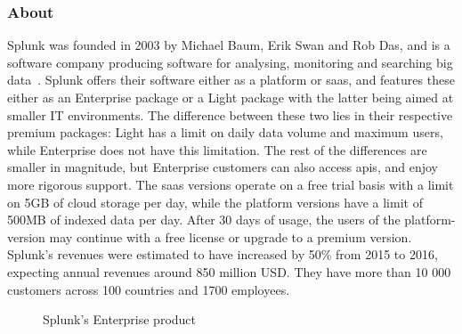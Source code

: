 \subsubsection{About}
Splunk was founded in 2003 by Michael Baum, Erik Swan and Rob Das, and is a software company producing software for analysing, monitoring and searching big data~\cite{derrickharris2010}. Splunk offers their software either as a platform or \gls{saas}, and features these either as an Enterprise package or a Light package with the latter being aimed at smaller IT environments. The difference between these two lies in their respective premium packages: Light has a limit on daily data volume and maximum users, while Enterprise does not have this limitation. The rest of the differences are smaller in magnitude, but Enterprise customers can also access \glspl{api}, and enjoy more rigorous support. The \gls{saas} versions operate on a free trial basis with a limit on 5GB of cloud storage per day, while the platform versions have a limit of 500MB of indexed data per day. After 30 days of usage, the users of the platform-version may continue with a free license or upgrade to a premium version. Splunk's revenues were estimated to have increased by 50\% from 2015 to 2016, expecting annual revenues around 850 million USD. They have more than 10 000 customers across 100 countries and 1700 employees.

\begin{figure}[H]
    \centering
    \caption{Splunk's Enterprise product~\cite{splunkinc20162}}
    \label{fig:splunk}
\end{figure}

